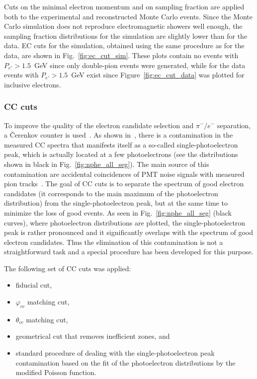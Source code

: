 Cuts on the minimal electron momentum and on sampling fraction are applied both to the experimental and reconstructed Monte Carlo events. Since the Monte Carlo simulation does not reproduce electromagnetic showers well enough, the sampling fraction distributions for the simulation are slightly lower than for the data. EC cuts for the simulation, obtained using the same  procedure as for the data, are shown in Fig.~\ref{fig:ec_cut_sim}. These plots contain no events with $P_{e'} > 1.5$~GeV since only double-pion events were generated, while for the data events with $P_{e'} > 1.5$~GeV exist since Figure~\ref{fig:ec_cut_data} was plotted for inclusive electrons.





\subsubsection{CC cuts}
\label{Sect:cc_cuts} 
To improve the quality of the electron candidate selection and $\pi^{-}/e^{-}$ separation, a \v Cerenkov counter is used~\cite{Adams:2001kk}. As shown in~\cite{Osipenko:2004}, there is a contamination in the measured CC spectra that manifests itself as a so-called single-photoelectron peak, which is actually located at a few photoelectrons (see the distributions shown in black in Fig.~\ref{fig:nphe_all_seg}). The main source of this contamination are accidental coincidences of PMT noise signals with measured pion tracks~\cite{Osipenko:2004}. The goal of CC cuts is to separate the spectrum of good electron candidates (it corresponds to the main maximum of the photoelectron distribution) from the single-photoelectron peak, but at the same time to minimize the loss of good events. As seen in Fig.~\ref{fig:nphe_all_seg} (black curves), where photoelectron distributions are plotted, the single-photoelectron peak is rather pronounced and it significantly overlaps with the spectrum of good electron candidates. Thus the elimination of this contamination is not a straightforward task and a special procedure has been developed for this purpose. 

The following set of CC cuts was applied:\vspace{-0.5em}

\begin{itemize}
\item fiducial cut,\vspace{-0.5em}
\item $\varphi_{cc}$ matching cut,\vspace{-0.5em}
\item $\theta_{cc}$ matching cut,\vspace{-0.5em}
\item geometrical cut that removes inefficient zones, and\vspace{-0.5em}
\item standard procedure of dealing with the single-photoelectron peak contamination based on the fit of the photoelectron distributions by the modified Poisson function.
\end{itemize}


